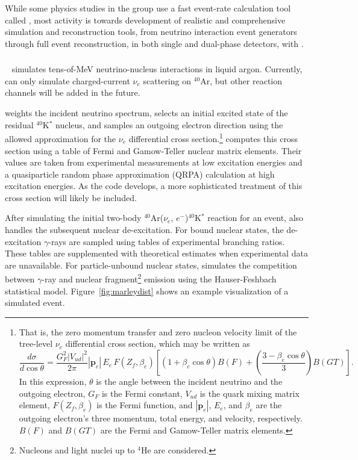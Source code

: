 While
some physics studies in the  group
 use a fast event-rate calculation tool called , most
 activity is towards development of realistic and comprehensive
 simulation and reconstruction tools, from neutrino interaction event
 generators through full event reconstruction, in both single and
 dual-phase detectors, with .


\subsubsection{}

~\cite{marley} simulates tens-of-MeV
neutrino-nucleus interactions in liquid argon. Currently,  can only
simulate charged-current $\nu_e$ scattering on $^{40}$Ar, but other
reaction channels will be added in the future.

 weights the incident neutrino spectrum, selects an initial excited state
of the residual $^{40}$K$^*$ nucleus, and samples an outgoing electron
direction using the allowed approximation for the $\nu_e$  differential cross
section.\footnote{That is, the zero momentum transfer and zero nucleon velocity
limit of the tree-level $\nu_e$  differential cross section, which may be
written as
\[
\frac{d\sigma}{d\cos \theta}
= \frac{G_F^2 |V_{ud}|^2}{2\pi} |\mathbf{p}_e|\, E_e \,F(Z_f, \beta_e)
\left[(1+\beta_e \cos\theta)B(F) + \left(\frac{3 - \beta_e \cos\theta}
{3}\right)B(GT)\right].
\]
In this expression, $\theta$ is the angle between the incident neutrino and the
outgoing electron, $G_F$ is the Fermi constant, $V_{ud}$ is the quark mixing
matrix element, $F(Z_f, \beta_e)$ is the Fermi function, and $|\mathbf{p}_e|$,
$E_e$, and $\beta_e$ are the outgoing electron's three momentum, total energy,
and velocity, respectively. $B(F)$ and $B(GT)$ are the Fermi and Gamow-Teller
matrix elements.
}
 computes this cross section using a table of Fermi and Gamow-Teller
nuclear matrix elements. Their values are taken from experimental measurements
at low excitation energies and a quasiparticle random phase approximation
(QRPA) calculation at high excitation energies. As the code develops, a more
sophisticated treatment of this cross section will likely be included.

After simulating the initial two-body $^{40}${Ar}($\nu_e$,
$e^{-}$)$^{40}$K$^*$ reaction for an event, 
also handles the subsequent nuclear de-excitation. For bound nuclear
states, the de-excitation $\gamma$-rays are sampled using tables of
experimental branching ratios. These tables are supplemented with
theoretical estimates when experimental data are unavailable. For
particle-unbound nuclear states,  simulates the competition between
$\gamma$-ray and nuclear fragment\footnote{ Nucleons and light nuclei up to
$^{4}${He} are considered.} emission using the Hauser-Feshbach
statistical model.   Figure~\ref{fig:marleydist} shows an example
visualization of a simulated  event.

